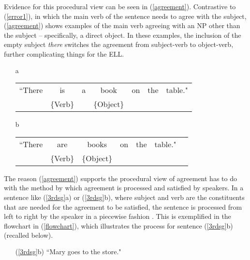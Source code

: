\documentclass{article}
\begin{document}
    Evidence for this procedural view can be seen in (\ref{agreement}). Contrastive to (\ref{error1}), in which the main verb of the sentence needs to agree with the subject, (\ref{agreement}) shows examples of the main verb agreeing with an NP other than the subject – specifically, a direct object. In these examples, the inclusion of the empty subject \textit{there} switches the agreement from subject-verb to object-verb, further complicating things for the ELL.
\begin{exe}
	\ex
    \label{agreement}
    	\begin{itemize}
        	\item[a]
            	\begin{tabular}{c c c c c c c}
            	“There & is & a & book & on & the & table." \\
            	{} & \{Verb\} & {} & \{Object\} & {} & {} & {} 
            	\end{tabular}
            \item[b]
            	\begin{tabular}{c c c c c c c}
                “There & are & books & on & the & table." \\
                {} & \{Verb\} & \{Object\} & {} & {} & {}
                \end{tabular}
        \end{itemize}
\end{exe}
The reason (\ref{agreement}) supports the procedural view of agreement has to do with the method by which agreement is processed and satisfied by speakers. In a sentence like (\ref{3rdsg}a) or (\ref{3rdsg}b), where subject and verb are the constituents that are needed for the agreement to be satisfied, the sentence is processed from left to right by the speaker in a piecewise fashion \citep{O'Grady2006}. This is exemplified in the flowchart in (\ref{flowchart}), which illustrates the process for sentence (\ref{3rdsg}b) (recalled below).

\newpage

\begin{itemize}
	\item[(\ref{3rdsg}b)]{“Mary goes to the store."}
\end{itemize}
\end{document}

